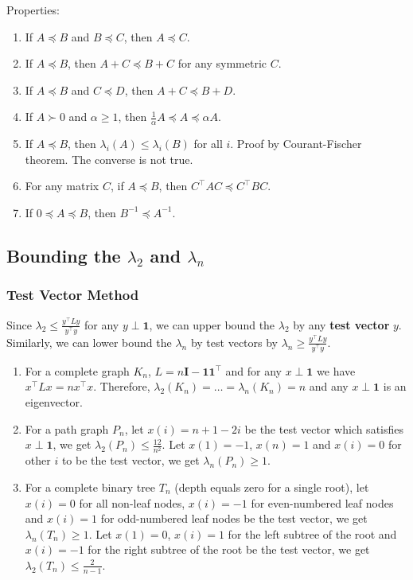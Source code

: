 Properties:
\begin{enumerate}
    \item If $A \preceq B$ and $B \preceq C$, then $A \preceq C$.
    \item If $A \preceq B$, then $A+C \preceq B+C$ for any symmetric $C$.
    \item If $A \preceq B$ and $C \preceq D$, then $A+C \preceq B+D$.
    \item If $A \succ 0$ and $\alpha \ge 1$, then $\frac{1}{\alpha} A \preceq A \preceq \alpha A$.
    \item If $A \preceq B$, then $\lambda_i(A) \le \lambda_i(B)$ for all $i$. Proof by Courant-Fischer theorem. The converse is not true.
    \item For any matrix $C$, if $A \preceq B$, then $C^\top A C \preceq C^\top B C$.
    \item If $0 \preceq A \preceq B$, then $B^{-1} \preceq A^{-1}$.
\end{enumerate}

\subsection{Bounding the $\lambda_2$ and $\lambda_n$}

\subsubsection{Test Vector Method}
Since $\lambda_2 \le \frac{y^\top L y}{y^\top y}$ for any $y \perp \boldsymbol{1}$, we can upper bound the $\lambda_2$ by any \textbf{test vector} $y$. Similarly, we can lower bound the $\lambda_n$ by test vectors by $\lambda_n \ge \frac{y^\top L y}{y^\top y}$.

\begin{enumerate}
    \item For a complete graph $K_n$, $L = n \boldsymbol{I} - \boldsymbol{1}\boldsymbol{1}^\top$ and for any $x \perp \boldsymbol{1}$ we have $x^\top L x = n x^\top x$. Therefore, $\lambda_2(K_n) = \dots = \lambda_n(K_n) = n$ and any $x \perp \boldsymbol{1}$ is an eigenvector.
    \item For a path graph $P_n$, let $x(i) = n+1 - 2i$ be the test vector which satisfies $x \perp \boldsymbol{1}$, we get $\lambda_2(P_n) \le \frac{12}{n^2}$. Let $x(1)=-1$, $x(n)=1$ and $x(i)=0$ for other $i$ to be the test vector, we get $\lambda_n(P_n) \ge 1$.
    \item For a complete binary tree $T_n$ (depth equals zero for a single root), let $x(i)=0$ for all non-leaf nodes, $x(i)=-1$ for even-numbered leaf nodes and $x(i)=1$ for odd-numbered leaf nodes be the test vector, we get $\lambda_n(T_n) \ge 1$. Let $x(1)=0$, $x(i)=1$ for the left subtree of the root and $x(i)=-1$ for the right subtree of the root be the test vector, we get $\lambda_2(T_n) \le \frac{2}{n-1}$.
\end{enumerate}

